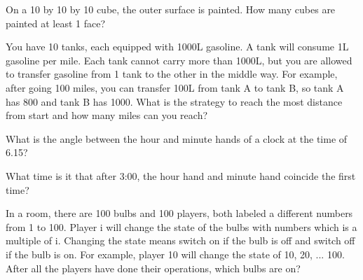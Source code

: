 \begin{exe}
On a 10 by 10 by 10 cube, the outer surface is painted. How many cubes are painted at least 1 face?
\end{exe}
\begin{teacher}
\begin{sol}
\end{sol}
\end{teacher}

\begin{exe}
You have 10 tanks, each equipped with 1000L gasoline. A tank will consume 1L gasoline per mile. Each tank cannot carry more than 1000L, but you are allowed to transfer gasoline from 1 tank to the other in the middle way. For example, after going 100 miles, you can transfer 100L from tank A to tank B, so tank A has 800 and tank B has 1000. What is the strategy to reach the most distance from start and how many miles can you reach?
\end{exe}
\begin{teacher}
\begin{sol}
\end{sol}
\end{teacher}

\begin{exe}
What is the angle between the hour and minute hands of a clock at the time of 6.15?
\end{exe}
\begin{teacher}
\begin{sol}
\end{sol}
\end{teacher}

\begin{exe}
What time is it that after 3:00, the hour hand and minute hand coincide the first time?
\end{exe}
\begin{teacher}
\begin{sol}
\end{sol}
\end{teacher}

\begin{exe}
In a room, there are 100 bulbs and 100 players, both labeled a different numbers from 1 to 100. Player i will change the state of the bulbs with numbers which is a multiple of i. Changing the state means switch on if the bulb is off and switch off if the bulb is on. For example, player 10 will change the state of 10, 20, ... 100. After all the players have done their operations, which bulbs are on?
\end{exe}
\begin{teacher}
\begin{sol}
\end{sol}
\end{teacher}

